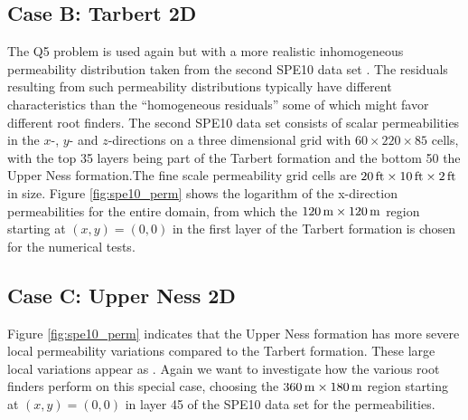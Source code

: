 



\clearpage
\subsection{Case B: Tarbert 2D}
\label{section:caseB}
The Q5 problem is used again but with a more realistic inhomogeneous permeability distribution taken from the second SPE10 data set \citep{spe10_2000}. The residuals resulting from such permeability distributions typically have different characteristics than the ``homogeneous residuals'' some of which might favor different root finders. The second SPE10 data set consists of scalar permeabilities in the $x$-, $y$- and $z$-directions on a three dimensional grid with $60\times 220\times 85$ cells, with the top 35 layers being part of the Tarbert formation and the bottom 50 the Upper Ness formation.The fine scale permeability grid cells are $\unit[20]{ft}\times \unit[10]{ft}\times \unit[2]{ft}$ in size. Figure \ref{fig:spe10_perm} shows the logarithm of the x-direction permeabilities for the entire domain, from which the $\unit[120]{m}\times \unit[120]{m}$ region starting at $(x,y) = (0,0)$ in the first layer of the Tarbert formation is chosen for the numerical tests.






\clearpage
\subsection{Case C: Upper Ness 2D}
\label{section:caseC}
Figure \ref{fig:spe10_perm} indicates that the Upper Ness formation has more severe local permeability variations compared to the Tarbert formation. These large local variations appear as . Again we want to investigate how the various root finders perform on this special case, choosing the $\unit[360]{m}\times \unit[180]{m}$ region starting at $(x,y) = (0,0)$ in layer 45 of the SPE10 data set for the permeabilities.





